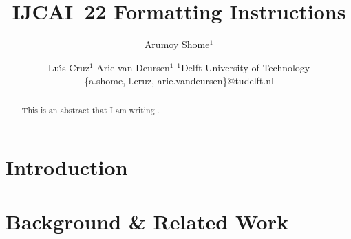 \documentclass{article}
\title{IJCAI--22 Formatting Instructions}
\author{
  Arumoy Shome$^1$
  \and
  Lu{\'\i}s Cruz$^1$\And
  Arie van Deursen$^{1}$
  \affiliations
  $^1$Delft University of Technology\\
  \emails
  \{a.shome, l.cruz, arie.vandeursen\}@tudelft.nl
}
\begin{document}
\maketitle

\begin{abstract}
  This is an abstract that I am writing \cite{sambasivan}.
\end{abstract}

\appendix

\section{Introduction}\label{sec:intro}




\section{Background \& Related Work}\label{sec:related}
\end{document}

